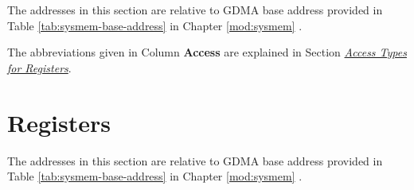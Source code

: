 \documentclass[main\_\_EN.tex]{subfiles}
\begin{document}
The addresses in this section are relative to GDMA base address provided in Table \ref{tab:sysmem-base-address} in Chapter \ref{mod:sysmem} \textit{}.

The abbreviations given in Column \textbf{Access} are explained in Section \hyperref[glossary-access-types]{\textit{Access Types for Registers}}.






\clearpage
\section{Registers}

The addresses in this section are relative to GDMA base address provided in Table \ref{tab:sysmem-base-address} in Chapter \ref{mod:sysmem} \textit{}.


\end{document}
